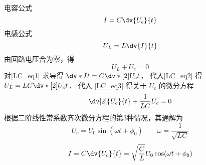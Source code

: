 
电容公式
\begin{equation}\label{LC_eq1}
I = C \dv{U_c}{t}
\end{equation}
电感公式
\begin{equation}\label{LC_eq2}
U_L = L \dv{I}{t}
\end{equation}
由回路电压合为零，得
\begin{equation}\label{LC_eq3}
U_L + U_c = 0
\end{equation}
对\autoref{LC_eq1} 求导得 $\dv*{I}{t} = C \dv*[2]{U_c}{t}$， 代入\autoref{LC_eq2} 得 $U_L = LC \dv*[2]{U_c}{t}$． 代入  \autoref{LC_eq3}  得关于 $U_c$ 的微分方程
\begin{equation}
\dv[2]{U_c}{t} + \frac{1}{LC} U_c = 0
\end{equation}
根据二阶线性常系数齐次微分方程的第3种情况，其通解为
\begin{equation}
U_c = U_0 \sin(\omega t + \phi_0) \qquad
\omega  = \frac{1}{\sqrt {LC}}
\end{equation}
\begin{equation}
I = C \dv{U_c}{t} = \sqrt{\frac{C}{L}} U_0 \cos(\omega t + \phi_0)
\end{equation}
 
